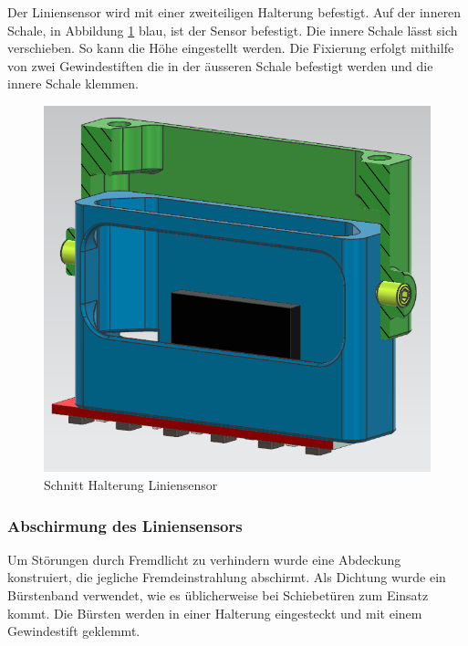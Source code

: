 Der Liniensensor wird mit einer zweiteiligen Halterung befestigt. Auf der inneren Schale, in Abbildung \ref{fig:Schnitt Halterung Liniensensor} blau, ist der Sensor befestigt. Die innere Schale lässt sich verschieben. So kann die Höhe eingestellt werden. Die Fixierung erfolgt mithilfe von zwei Gewindestiften die in der äusseren Schale befestigt werden und die innere Schale klemmen. 


\begin{figure}[H]
    \centering
    \includegraphics[width=0.75\linewidth]{assets//MT/Sensor Halterung.png}
    \caption{Schnitt Halterung Liniensensor}
    \label{fig:Schnitt Halterung Liniensensor}
\end{figure}


\subsubsection{Abschirmung des Liniensensors}
\label{Abschirmung des Liniensensors}

Um Störungen durch Fremdlicht zu verhindern wurde eine Abdeckung konstruiert, die jegliche Fremdeinstrahlung abschirmt. Als Dichtung wurde ein Bürstenband verwendet, wie es üblicherweise bei Schiebetüren zum Einsatz kommt. Die Bürsten werden in einer Halterung eingesteckt und mit einem Gewindestift geklemmt. 


